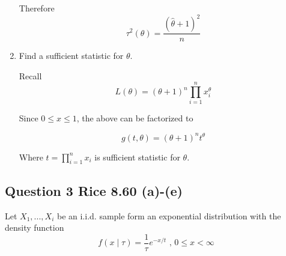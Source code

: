 \documentclass{tufte-book}
\theoremstyle{mytheoremstyle}
\theoremstyle{mylemstyle}
\theoremstyle{mydefstyle}
\begin{document}
\begin{enumerate}
Therefore
\[ \tau^2(\theta) = \frac{(\hat{\theta}+1)^2}{n} \]

\item Find a sufficient statistic for $\theta$.

Recall
\[L(\theta) = (\theta+1)^n \prod_{i=1}^n x_i^\theta \]

Since $0 \leq x \leq 1$, the above can be factorized to

\[ g(t,\theta) = (\theta+1)^n t^\theta \]

Where $t=\prod_{i=1}^n x_i$ is sufficient statistic for $\theta$.

\end{enumerate}


\subsection{Question 3 Rice 8.60 (a)-(e)}
Let $X_1,...,X_i$ be an i.i.d. sample form an exponential distribution with the density function
\[ f(x\mid \tau) = \frac{1}{\tau}e^{-x/t} \text{ , } 0 \leq x < \infty \]
\end{document}
